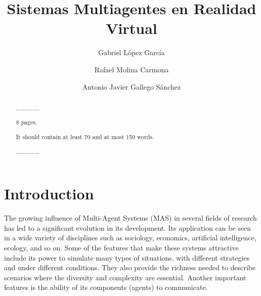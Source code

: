 \documentclass[runningheads]{llncs}
\begin{document}
\mainmatter


\title{Sistemas Multiagentes en Realidad Virtual}



\author{Gabriel L\'opez Garc\'ia \and Rafael Molina Carmona \and Antonio Javier Gallego S\'anchez}








\maketitle


\begin{abstract}
..............

8 pages.

It should contain at least 70 and at most 150 words.

..............

\end{abstract}



\section{Introduction
\label{sec:introduction}}

The growing influence of Multi-Agent Systems (MAS) in several fields of research has led to a significant evolution in its development. Its application can be seen in a wide variety of disciplines such as sociology, economics, artificial intelligence, ecology, and so on. Some of the features that make these systems attractive include its power to simulate many types of situations, with different strategies and under different conditions. They also provide the richness needed to describe scenarios where the diversity and complexity are essential. Another important features is the ability of its components (agents) to communicate.
\end{document}
